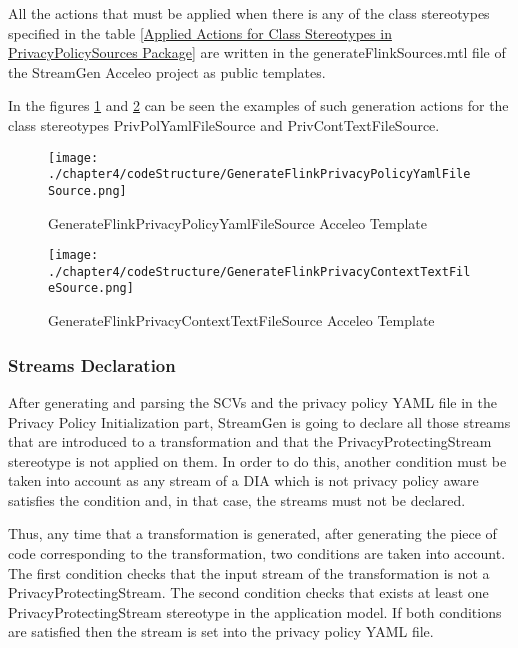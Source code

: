 All the actions that must be applied when there is any of the class stereotypes specified in the table \ref{Applied Actions for Class Stereotypes in PrivacyPolicySources Package} are written in the generateFlinkSources.mtl file of the StreamGen Acceleo project as public templates.

In the figures \ref{fig:GenerateFlinkPrivacyPolicyYamlFileSource Acceleo Template} and \ref{fig:GenerateFlinkPrivacyContextTextFileSource Acceleo Template} can be seen the examples of such generation actions for the class stereotypes PrivPolYamlFileSource and PrivContTextFileSource.

\begin{figure}
\centering
{\texttt{[image: ./chapter4/codeStructure/GenerateFlinkPrivacyPolicyYamlFileSource.png]}}
\caption{GenerateFlinkPrivacyPolicyYamlFileSource Acceleo Template}
\label{fig:GenerateFlinkPrivacyPolicyYamlFileSource Acceleo Template}
\end{figure}

\begin{figure}
\centering
{\texttt{[image: ./chapter4/codeStructure/GenerateFlinkPrivacyContextTextFileSource.png]}}
\caption{GenerateFlinkPrivacyContextTextFileSource Acceleo Template}
\label{fig:GenerateFlinkPrivacyContextTextFileSource Acceleo Template}
\end{figure}

\subsubsection{Streams Declaration}

After generating and parsing the SCVs and the privacy policy YAML file in the Privacy Policy Initialization part, StreamGen is going to declare all those streams that are introduced to a transformation and that the PrivacyProtectingStream stereotype is not applied on them. In order to do this, another condition must be taken into account as any stream of a DIA which is not privacy policy aware satisfies the condition and, in that case, the streams must not be declared.

Thus, any time that a transformation is generated, after generating the piece of code corresponding to the transformation, two conditions are taken into account. The first condition checks that the input stream of the transformation is not a PrivacyProtectingStream. The second condition checks that exists at least one PrivacyProtectingStream stereotype in the application model. If both conditions are satisfied then the stream is set into the privacy policy YAML file.
